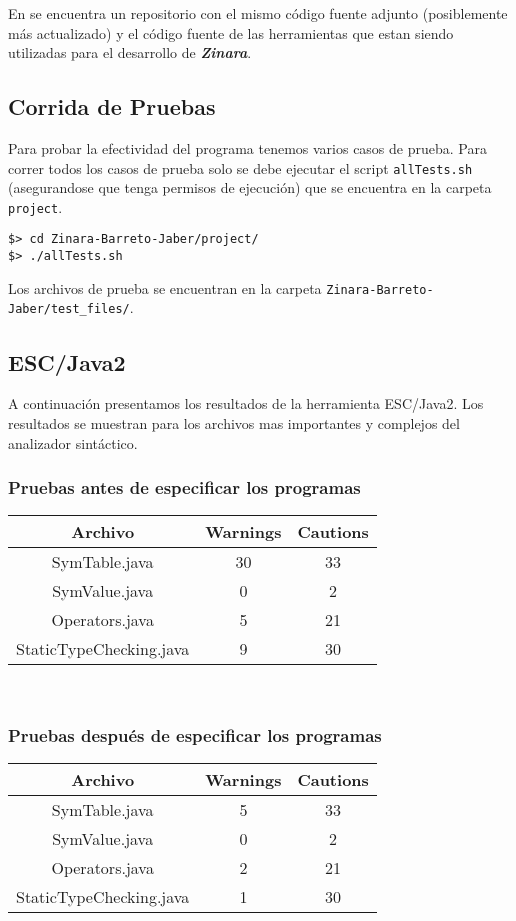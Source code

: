 \documentclass[12pt, spanish]{report}
\begin{document}
En \cite{github} se encuentra un repositorio con el mismo c\'odigo
fuente adjunto (posiblemente m\'as actualizado) y el c\'odigo fuente de
las herramientas que estan siendo utilizadas para el desarrollo de
\emph{\textbf{Zinara}}.

\subsection{Corrida de Pruebas}
\label{sec:pruebas}
Para probar la efectividad del programa tenemos varios casos de
prueba. Para correr todos los casos de prueba solo se debe ejecutar el
script \texttt{allTests.sh} (asegurandose que tenga permisos de
ejecución) que se encuentra en la carpeta \texttt{project}.

\begin{verbatim}
$> cd Zinara-Barreto-Jaber/project/
$> ./allTests.sh
\end{verbatim}

Los archivos de prueba se encuentran en la carpeta
\texttt{Zinara-Barreto-Jaber/test_files/}.

\subsection{ESC/Java2}
\label{sec:escjava}
A continuaci\'on presentamos los resultados de la herramienta
ESC/Java2. Los resultados se muestran para los archivos mas importantes
y complejos del analizador sint\'actico.\\

\subsubsection{Pruebas antes de especificar los programas}
\begin{tabular}{|c||cc|}
\hline
Archivo                 & Warnings & Cautions  \\
\hline \hline
SymTable.java           & 30  & 33 \\
SymValue.java           & 0   & 2  \\
Operators.java          & 5   & 21 \\
StaticTypeChecking.java & 9   & 30 \\
	\hline
\end{tabular}\\

\subsubsection{Pruebas despu\'es de especificar los programas}
\begin{tabular}{|c||cc|}
\hline
Archivo                 & Warnings & Cautions  \\
\hline \hline
SymTable.java           & 5   & 33 \\
SymValue.java           & 0   & 2  \\
Operators.java          & 2   & 21 \\
StaticTypeChecking.java & 1   & 30 \\
	\hline
\end{tabular}\\
\end{document}
